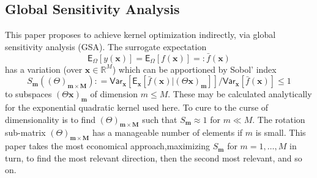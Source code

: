 \documentclass[preprint,12pt]{elsarticle}
\newcommand*{\M}[1]{\ensuremath{#1}\xspace}
\newcommand*{\vr}[1]{\M{\mathbf{#1}}}
\newcommand*{\st}[1]{\M{\mathbb{#1}}}
\newcommand*{\deq}{\M{\mathrel{\mathop:}=}}
\newcommand*{\deqr}{\M{=\mathrel{\mathop:}}}
\newcommand*{\ev}[2][]{\mathsf{E}_{#1}\!\left\lbrack{} #2 \right\rbrack}
\newcommand*{\var}[2][]{\mathsf{Var}_{#1}\!\left\lbrack{} #2 \right\rbrack}
\begin{document}
        \subsection{Global Sensitivity Analysis}
            This paper proposes to achieve kernel optimization indirectly, via global sensitivity analysis (GSA).
            The surrogate expectation
            \begin{equation*}
                \ev[\Omega]{y(\vr{x})} = \ev[\Omega]{f(\vr{x})} \deqr \bar{f}(\vr{x})
            \end{equation*}
            has a variation (over $\vr{x} \in \st{R}^{M}$) which can be apportioned by Sobol' index
            \begin{equation*}
                S_{\vr{m}}((\Theta)_{\vr{m}\times\vr{M}}) \deq \var[\vr{x}]{\ev[\vr{x}]{\bar{f}(\vr{x}) \vert (\Theta \vr{x})_{\vr{m}}}} / \var[\vr{x}]{\bar{f}(\vr{x})} \leq 1
            \end{equation*}
            to subspaces $(\Theta \vr{x})_{\vr{m}}$ of dimension $m\leq M$. These may be calculated analytically for the exponential quadratic kernel used here. To cure to the curse of dimensionality is to find $(\Theta)_{\vr{m}\times\vr{M}}$ such that $S_{\vr{m}} \approx 1$ for $m\ll M$. The rotation sub-matrix $(\Theta)_{\vr{m}\times\vr{M}}$ has a manageable number of elements if $m$ is small. This paper takes the most economical approach,maximizing $S_{\vr{m}}$ for $m=1,\ldots,M$ in turn, to find the most relevant direction, then the second most relevant, and so on. 
\end{document}
